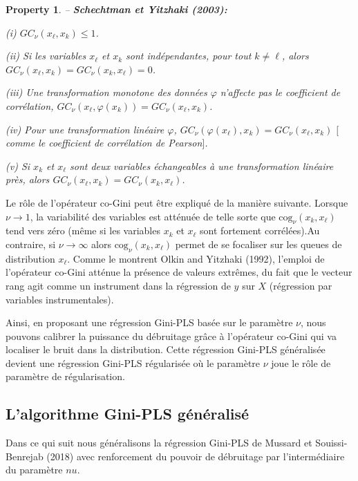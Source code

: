 \documentclass[a4paper, 12pt]{article}
\newcommand{\cog}{\text{cog}}
\newtheorem{property}{Property}
\numberwithin{equation}{section}
\begin{document}
\begin{property}\label{prop1} -- \textbf{\emph{Schechtman et Yitzhaki (2003):}}

\noindent \emph{(i)} $GC_\nu(x_\ell,x_k) \leq 1$.

\noindent\emph{(ii)} Si les variables $x_\ell$ et $x_k$ sont indépendantes, pour tout $k\neq \ell$, alors $GC_\nu(x_\ell,x_k) = GC_\nu(x_k,x_\ell) =0$.

\noindent\emph{(iii)} Une transformation monotone des données $\varphi$ n'affecte pas le coefficient de corrélation, $GC_\nu(x_\ell,\varphi(x_k)) = GC_\nu(x_\ell,x_k)$.

\noindent\emph{(iv)} Pour une transformation linéaire $\varphi$, $GC_\nu(\varphi(x_\ell),x_k) = GC_\nu(x_\ell,x_k)$ $[$comme le coefficient de corrélation de Pearson$]$.

\noindent\emph{(v)} Si $x_k$ et $x_\ell$ sont deux variables échangeables à une transformation linéaire près, alors $GC_\nu(x_\ell,x_k) = GC_\nu(x_k,x_\ell)$.
\end{property}

Le rôle de l'opérateur co-Gini peut être expliqué de la manière suivante. Lorsque $\nu \rightarrow 1$, la variabilité des variables est atténuée de telle sorte que $\cog_\nu(x_k,x_\ell)$ tend vers zéro (même si les variables $x_k$ et $x_\ell$ sont fortement corrélées).Au contraire, si $\nu \rightarrow \infty $ alors $\cog_\nu(x_k,x_\ell)$ permet de se focaliser sur les queues de distribution $x_\ell$. Comme le montrent Olkin and Yitzhaki (1992), l'emploi de l'opérateur co-Gini atténue la présence de valeurs extrêmes, du fait que le vecteur rang agit comme un instrument dans la régression de $y$ sur $X$ (régression par variables instrumentales).    

Ainsi, en proposant une régression Gini-PLS basée sur le paramètre $\nu$, nous pouvons calibrer la puissance du débruitage  grâce à l'opérateur co-Gini qui va localiser le bruit dans la distribution. Cette régression Gini-PLS généralisée devient une régression Gini-PLS régularisée où le paramètre $\nu$ joue le rôle de paramètre de régularisation. 


\subsection{L'algorithme Gini-PLS généralisé} 

Dans ce qui suit nous généralisons la régression Gini-PLS de Mussard et Souissi-Benrejab (2018) avec renforcement du pouvoir de débruitage par l'intermédiaire du paramètre $nu$.
\end{document}
